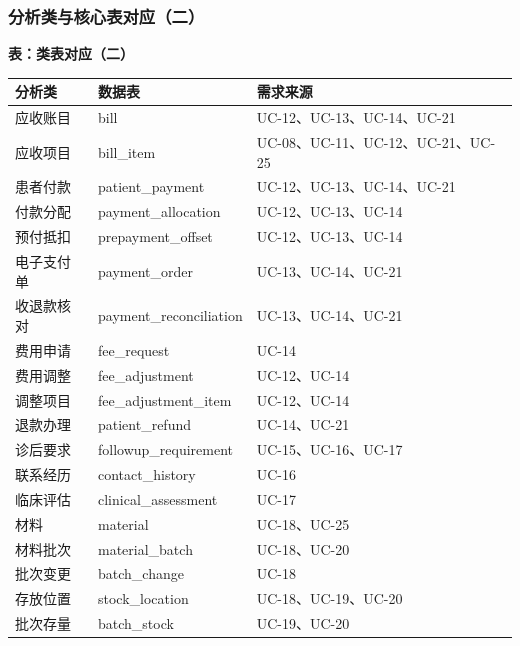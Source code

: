 \documentclass[UTF8,a4paper,zihao=-4,fontset=none]{ctexart}
\begin{document}
\subsubsection{分析类与核心表对应（二）}
\begingroup\small\linespread{1.02}\selectfont
{\setlength{\tabcolsep}{3pt}\renewcommand{\arraystretch}{1.07}
\noindent\textbf{表\thetable：类表对应（二）}\par\smallskip
\noindent\begin{tabular}{@{}>{\raggedright\arraybackslash}p{3.1cm}>{\raggedright\arraybackslash}p{6.5cm}>{\raggedright\arraybackslash}p{6.1cm}@{}}
\toprule
分析类 & 数据表 & 需求来源 \\ \midrule
应收账目 & bill & UC-12、UC-13、UC-14、UC-21 \\
应收项目 & bill\_\allowbreak{}item & UC-08、UC-11、UC-12、UC-21、UC-25 \\
患者付款 & patient\_\allowbreak{}payment & UC-12、UC-13、UC-14、UC-21 \\
付款分配 & payment\_\allowbreak{}allocation & UC-12、UC-13、UC-14 \\
预付抵扣 & prepayment\_\allowbreak{}offset & UC-12、UC-13、UC-14 \\
电子支付单 & payment\_\allowbreak{}order & UC-13、UC-14、UC-21 \\
收退款核对 & payment\_\allowbreak{}reconciliation & UC-13、UC-14、UC-21 \\
费用申请 & fee\_\allowbreak{}request & UC-14 \\
费用调整 & fee\_\allowbreak{}adjustment & UC-12、UC-14 \\
调整项目 & fee\_\allowbreak{}adjustment\_\allowbreak{}item & UC-12、UC-14 \\
退款办理 & patient\_\allowbreak{}refund & UC-14、UC-21 \\
诊后要求 & followup\_\allowbreak{}requirement & UC-15、UC-16、UC-17 \\
联系经历 & contact\_\allowbreak{}history & UC-16 \\
临床评估 & clinical\_\allowbreak{}assessment & UC-17 \\
材料 & material & UC-18、UC-25 \\
材料批次 & material\_\allowbreak{}batch & UC-18、UC-20 \\
批次变更 & batch\_\allowbreak{}change & UC-18 \\
存放位置 & stock\_\allowbreak{}location & UC-18、UC-19、UC-20 \\
批次存量 & batch\_\allowbreak{}stock & UC-19、UC-20 \\

\end{tabular}}
\end{document}
